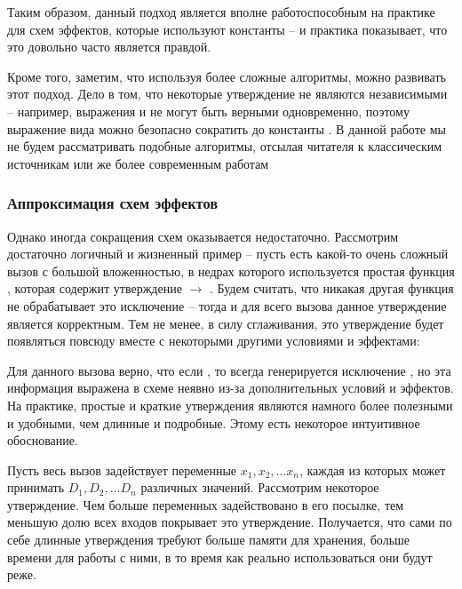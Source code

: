 Таким образом, данный подход является вполне работоспособным на практике для схем эффектов, которые используют константы -- и практика показывает, что это довольно часто является правдой.

Кроме того, заметим, что используя более сложные алгоритмы, можно развивать этот подход. Дело в том, что некоторые утверждение не являются независимыми -- например, выражения  и  не могут быть верными одновременно, поэтому выражение вида  можно безопасно сократить до константы . В данной работе мы не будем рассматривать подобные алгоритмы, отсылая читателя к классическим источникам \cite{McCluskey56} или же более современным работам \cite{Jain08}


\subsubsection{Аппроксимация схем эффектов}

Однако иногда сокращения схем оказывается недостаточно. Рассмотрим достаточно логичный и жизненный пример -- пусть есть какой-то очень сложный вызов с большой вложенностью, в недрах которого используется простая функция , которая содержит утверждение  $\rightarrow$ . Будем считать, что никакая другая функция не обрабатывает это исключение -- тогда и для всего вызова данное утверждение является корректным. Тем не менее, в силу сглаживания, это утверждение будет появляться повсюду вместе с некоторыми другими условиями и эффектами:

{}

Для данного вызова верно, что если , то всегда генерируется исключение , но эта информация выражена в схеме неявно из-за дополнительных условий и эффектов. На практике, простые и краткие утверждения являются намного более полезными и удобными, чем длинные и подробные. Этому есть некоторое интуитивное обоснование. 

Пусть весь вызов задействует переменные $x_1, x_2, \ldots x_n$, каждая из которых может принимать $D_1, D_2, \ldots D_n$ различных значений. Рассмотрим некоторое утверждение. Чем больше переменных задействовано в его посылке, тем меньшую долю всех входов покрывает это утверждение. Получается, что сами по себе длинные утверждения требуют больше памяти для хранения, больше времени для работы с ними, в то время как реально использоваться они будут реже. 

